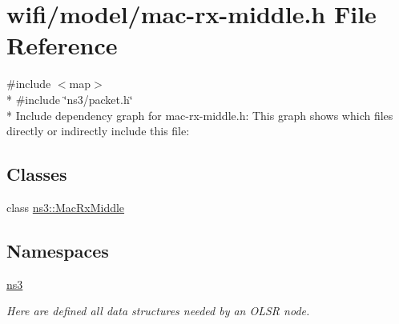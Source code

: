 \hypertarget{mac-rx-middle_8h}{}\section{wifi/model/mac-\/rx-\/middle.h File Reference}
\label{mac-rx-middle_8h}
{\ttfamily \#include $<$map$>$}\\*
{\ttfamily \#include \char`\"{}ns3/packet.\+h\char`\"{}}\\*
Include dependency graph for mac-\/rx-\/middle.h\+:
This graph shows which files directly or indirectly include this file\+:
\subsection*{Classes}
\begin{DoxyCompactItemize}
\item 
class \hyperlink{classns3_1_1MacRxMiddle}{ns3\+::\+Mac\+Rx\+Middle}
\end{DoxyCompactItemize}
\subsection*{Namespaces}
\begin{DoxyCompactItemize}
\item 
 \hyperlink{namespacens3}{ns3}
\begin{DoxyCompactList}\small\item\em Here are defined all data structures needed by an O\+L\+SR node. \end{DoxyCompactList}\end{DoxyCompactItemize}
